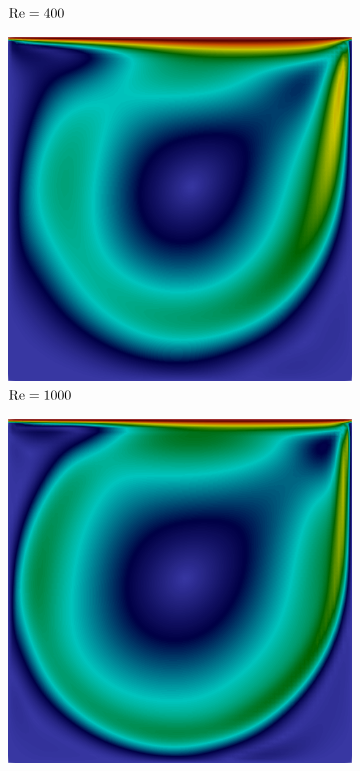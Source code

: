 \begin{figure}[h!]
\begin{subfigure}{0.32\textwidth}
        \caption{$\mathrm{Re}=400$}
    \end{subfigure}
    \begin{subfigure}{0.32\textwidth}
        \includegraphics[width=\linewidth]{Figuras/Cavity/Re1000.png}
        \caption{$\mathrm{Re}=1000$}
    \end{subfigure}
    \begin{subfigure}{0.32\textwidth}
        \includegraphics[width=\linewidth]{Figuras/Cavity/Re5000.png}

\end{subfigure}
\end{figure}
